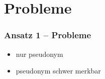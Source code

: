 \section{Probleme}
\begin{frame}
	\frametitle{Ansatz 1 -- Probleme}
	\begin{itemize}
		\item<2-> nur pseudonym
		\item<3-> pseudonym schwer merkbar
	\end{itemize}
\end{frame}
